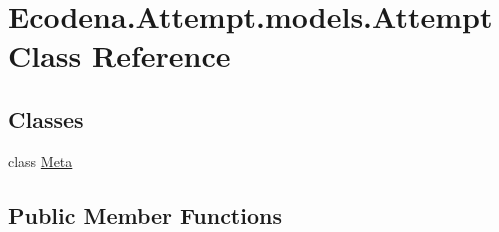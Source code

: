 \hypertarget{class_ecodena_1_1_attempt_1_1models_1_1_attempt}{
\section{Ecodena.Attempt.models.Attempt Class Reference}
\label{d5/da0/class_ecodena_1_1_attempt_1_1models_1_1_attempt}
}
\subsection*{Classes}
\begin{DoxyCompactItemize}
\item 
class \hyperlink{class_ecodena_1_1_attempt_1_1models_1_1_attempt_1_1_meta}{Meta}
\end{DoxyCompactItemize}
\subsection*{Public Member Functions}
